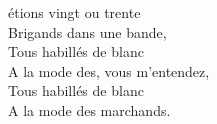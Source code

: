 
 étions vingt ou trente
\\Brigands dans une bande,
\\Tous habillés de blanc
\\A la mode des, vous m'entendez,
\\Tous habillés de blanc
\\A la mode des marchands.
